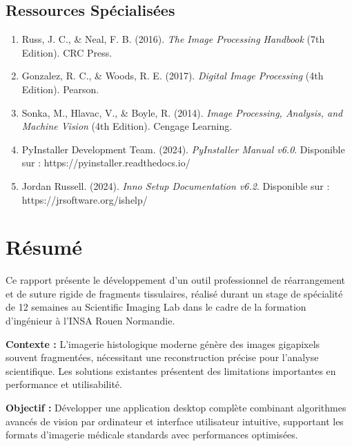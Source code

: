 \documentclass[12pt,a4paper]{article}
\begin{document}
\subsection{Ressources Spécialisées}

\begin{enumerate}
\item Russ, J. C., \& Neal, F. B. (2016). \textit{The Image Processing Handbook} (7th Edition). CRC Press.

\item Gonzalez, R. C., \& Woods, R. E. (2017). \textit{Digital Image Processing} (4th Edition). Pearson.

\item Sonka, M., Hlavac, V., \& Boyle, R. (2014). \textit{Image Processing, Analysis, and Machine Vision} (4th Edition). Cengage Learning.

\item PyInstaller Development Team. (2024). \textit{PyInstaller Manual v6.0}. Disponible sur : https://pyinstaller.readthedocs.io/

\item Jordan Russell. (2024). \textit{Inno Setup Documentation v6.2}. Disponible sur : https://jrsoftware.org/ishelp/
\end{enumerate}

\newpage

\newpage
\thispagestyle{empty}

\vspace*{1cm}

\section*{Résumé}

Ce rapport présente le développement d'un outil professionnel de réarrangement et de suture rigide de fragments tissulaires, réalisé durant un stage de spécialité de 12 semaines au Scientific Imaging Lab dans le cadre de la formation d'ingénieur à l'INSA Rouen Normandie.

\textbf{Contexte :} L'imagerie histologique moderne génère des images gigapixels souvent fragmentées, nécessitant une reconstruction précise pour l'analyse scientifique. Les solutions existantes présentent des limitations importantes en performance et utilisabilité.

\textbf{Objectif :} Développer une application desktop complète combinant algorithmes avancés de vision par ordinateur et interface utilisateur intuitive, supportant les formats d'imagerie médicale standards avec performances optimisées.
\end{document}
